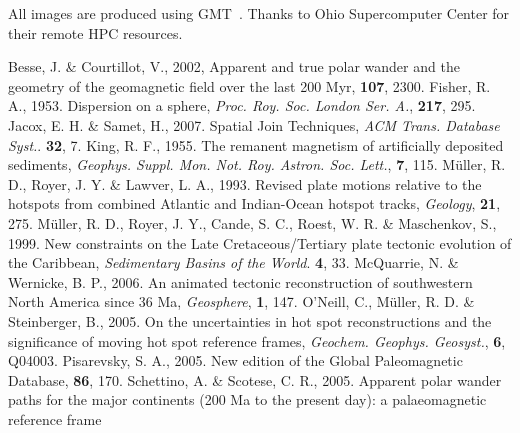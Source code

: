 \begin{acknowledgments}
All images are produced using GMT~\cite{W13}. Thanks to Ohio Supercomputer
Center for their remote HPC resources.
\end{acknowledgments}

\begin{thebibliography}{}
  Besse, J. \& Courtillot, V., 2002, Apparent and true polar wander and the
  geometry of the geomagnetic field over the last 200 Myr, \jgr{}\textbf{107},
  2300.
  Fisher, R. A., 1953. Dispersion on a sphere, \textit{Proc. Roy. Soc. London
  Ser. A.}, \textbf{217}, 295.
  Jacox, E. H. \& Samet, H., 2007. Spatial Join Techniques, \textit{ACM Trans.
  Database Syst.}. \textbf{32}, 7.
  King, R. F., 1955. The remanent magnetism of artificially deposited sediments,
  \textit{Geophys. Suppl. Mon. Not. Roy. Astron. Soc. Lett.}, \textbf{7},
  115.
  M{\"{u}}ller, R. D., Royer, J. Y. \& Lawver, L. A., 1993. Revised plate
  motions relative to the hotspots from combined Atlantic and Indian-Ocean
  hotspot tracks, \textit{Geology}, \textbf{21}, 275.
  M{\"{u}}ller, R. D., Royer, J. Y., Cande, S. C., Roest, W. R. \& Maschenkov,
  S., 1999. New constraints on the Late Cretaceous/Tertiary plate tectonic
  evolution of the Caribbean, \textit{Sedimentary Basins of the World}.
  \textbf{4}, 33.
  McQuarrie, N. \& Wernicke, B. P., 2006. An animated tectonic reconstruction of
  southwestern North America since 36 Ma, \textit{Geosphere}, \textbf{1},
  147.
  O'Neill, C., M{\"{u}}ller, R. D. \& Steinberger, B., 2005. On the
  uncertainties in hot spot reconstructions and the significance of moving hot
  spot reference frames, \textit{Geochem. Geophys. Geosyst.}, \textbf{6},
  Q04003.
  Pisarevsky, S. A., 2005. New edition of the Global Paleomagnetic Database,
  \eos{}\textbf{86}, 170.
  Schettino, A. \& Scotese, C. R., 2005. Apparent polar wander paths for the
  major continents (200 Ma to the present day): a palaeomagnetic reference frame

\end{thebibliography}
